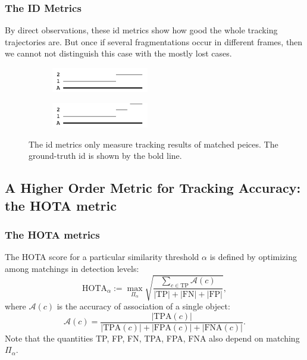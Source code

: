 \documentclass[slidetop, mathserif]{beamer}
\begin{document}
\begin{frame}
	\frametitle{The ID Metrics}
	
	By direct observations, these id metrics show how good the whole tracking trajectories are.
	But once if several fragmentations occur in different frames,
	then we cannot not distinguish this case with the mostly lost cases.
	
	\begin{figure}
		\begin{subfigure}{.5\textwidth}
			\centering
			\includegraphics[width=120pt]{pics/fig6.png}
		\end{subfigure}%
		\begin{subfigure}{.5\textwidth}
			\centering
			\includegraphics[width=120pt]{pics/fig7.png}
		\end{subfigure}
		\caption{The id metrics only measure tracking results of matched peices.
		The ground-truth id is shown by the bold line.}
	\end{figure}
	
\end{frame}

\subsection{A Higher Order Metric for Tracking Accuracy: the HOTA metric}

\begin{frame}
    \frametitle{The HOTA metrics}

    The HOTA score for a particular similarity threshold $\alpha$ is defined by
    optimizing among matchings in detection levels:
    \[
        \text{HOTA}_\alpha := 
        \max_{\Pi_\alpha} \sqrt{\dfrac{\sum_{c\in\text{TP}} \mathcal A(c) }{|\text{TP}|+|\text{FN}|+|\text{FP}|}},
    \]
    where $\mathcal A(c)$ is the accuracy of association of a single object:
    \[
        \mathcal A(c) = \dfrac{|\text{TPA}(c)|}{|\text{TPA}(c)|+|\text{FPA}(c)|+|\text{FNA}(c)|}.
    \]
    Note that the quantities TP, FP, FN, TPA, FPA, FNA also depend on matching $\Pi_\alpha$.

\end{frame}
\end{document}
